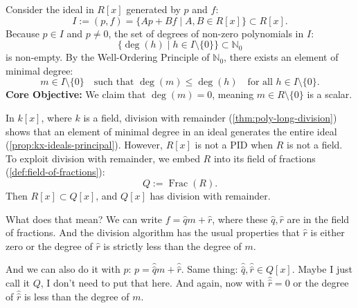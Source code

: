 \begin{proofWrapper}
\begin{content}
Consider the ideal in $R[x]$ generated by $p$ and $f$:
\begin{equation}\label{eq:ideal-I-def}
I := (p, f) = \{ A p + B f \mid A, B \in R[x] \} \subset R[x].
\end{equation}
Because $p \in I$ and $p \neq 0$, the set of degrees of non-zero polynomials in $I$:
\[
\{ \deg(h) \mid h \in I \setminus \{0\} \} \subset \mathbb{N}_0
\]
is non-empty. By the Well-Ordering Principle of $\mathbb{N}_0$, there exists an element of minimal degree:
\begin{equation}\label{eq:m-minimal-def}
m \in I \setminus \{0\} \quad \text{such that } \deg(m) \le \deg(h) \quad \text{for all } h \in I \setminus \{0\}.
\end{equation}
\textbf{Core Objective:} We claim that $\deg(m) = 0$, meaning $m \in R \setminus \{0\}$ is a scalar.

\begin{steps}
In $k[x]$, where $k$ is a field, division with remainder (\cref{thm:poly-long-division}) shows that an element of minimal degree in an ideal generates the entire ideal (\cref{prop:kx-ideals-principal}). However, $R[x]$ is not a PID when $R$ is not a field.
To exploit division with remainder, we embed $R$ into its field of fractions (\cref{def:field-of-fractions}):
\[
Q := \operatorname{Frac}(R).
\]
Then $R[x] \subset Q[x]$, and $Q[x]$ has division with remainder.
\end{steps}
\end{content}

\begin{speech}[00:39:16 - 00:41:26]
What does that mean? We can write $f = \hat{q} m + \hat{r}$,  where these $\hat{q}, \hat{r}$ are in the field of fractions.  And the division algorithm has the usual properties that $\hat{r}$ is either zero or the degree of $\hat{r}$ is strictly less than the degree of $m$. 

And we can also do it with $p$: $p = \hat{\hat{q}} m + \hat{\hat{r}}$.  Same thing: $\hat{\hat{q}}, \hat{\hat{r}} \in Q[x]$.  Maybe I just call it $Q$, I don't need to put that here. And again, now with $\hat{\hat{r}} = 0$ or the degree of $\hat{\hat{r}}$ is less than the degree of $m$. 


\end{speech}
\end{proofWrapper}
